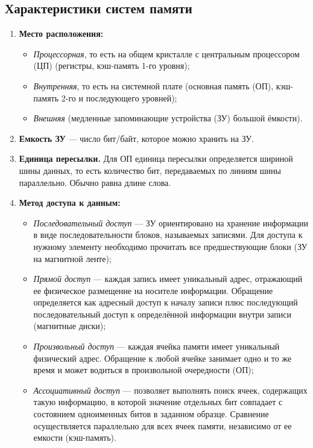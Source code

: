 \subsection{Характеристики систем памяти}\label{subsec:memory-system-characteristics}
\begin{enumerate}
    \item \textbf{Место расположения:}
          \begin{itemize}
              \item \emph{Процессорная}, то есть на общем кристалле с центральным процессором (ЦП) (регистры, кэш-память 1-го уровня);
              \item \emph{Внутренняя}, то есть на системной плате (основная память (ОП), кэш-память 2-го и последующего уровней);
              \item \emph{Внешняя} (медленные запоминающие устройства (ЗУ) большой ёмкости).
          \end{itemize}
    \item \textbf{Емкость ЗУ} --- число бит/байт, которое можно хранить на ЗУ.
    \item \textbf{Единица пересылки.} Для ОП единица пересылки определяется шириной шины данных, то есть количество бит, передаваемых по линиям шины параллельно. Обычно равна длине слова.
    \item \textbf{Метод доступа к данным:}
          \begin{itemize}
              \item \emph{Последовательный доступ} --- ЗУ ориентировано на хранение информации в виде последовательности блоков, называемых записями. Для доступа к нужному элементу необходимо прочитать все предшествующие блоки (ЗУ на магнитной ленте);
              \item \emph{Прямой доступ} --- каждая запись имеет уникальный адрес, отражающий ее физическое размещение на носителе информации. Обращение определяется как адресный доступ к началу записи плюс последующий последовательный доступ к определённой информации внутри записи (магнитные диски);
              \item \emph{Произвольный доступ} --- каждая ячейка памяти имеет уникальный физический адрес. Обращение к любой ячейке занимает одно и то же время и может водиться в произвольной очередности (ОП);
              \item \emph{Ассоциативный доступ} --- позволяет выполнять поиск ячеек, содержащих такую информацию, в которой значение отдельных бит совпадает с состоянием одноименных битов в заданном образце. Сравнение осуществляется параллельно для всех ячеек памяти, независимо от ее емкости (кэш-память).

\end{itemize}
\end{enumerate}

